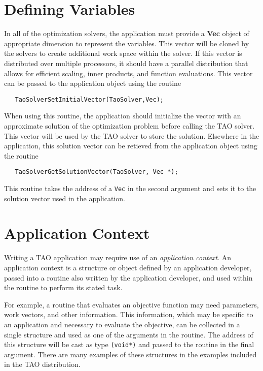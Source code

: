 \section{Defining Variables}
In all of the optimization solvers, the application must provide
a {\bf Vec} object of appropriate dimension to represent the variables.
This vector will be cloned by the solvers to create additional work
space within the solver.
If this vector is distributed over multiple processors, it
should have a parallel distribution that allows
for efficient scaling, inner products, and
function evaluations.  This vector can be passed to the
application object using the routine 
\begin{verbatim}
   TaoSolverSetInitialVector(TaoSolver,Vec);
\end{verbatim}
When using this routine, the application should initialize the vector with
an approximate solution of the optimization problem before calling the
TAO solver.
This vector will be used by the TAO solver to store the solution.
Elsewhere in the application, 
this solution vector can be retieved from the application object 
using the routine 
\begin{verbatim}
   TaoSolverGetSolutionVector(TaoSolver, Vec *);
\end{verbatim}
This routine takes the address of a {\tt Vec} in the second argument and sets it to
the solution vector used in the application.

\section{Application Context}  
Writing a TAO application may require
use of an {\em application context}.
An application context is a structure or object defined by an
application developer, passed
into a routine also written by the application developer, 
and used within the routine to perform its stated task.
 
For example, a routine that evaluates an objective function may need
parameters, work vectors, and other information.   This information,
which may be specific to an application and necessary to evaluate the objective,
can be collected in a single structure and used as one of the
arguments in the routine.
The address of this structure will be cast as type {\tt (void*)} and passed to
the routine in the final argument.
There are many examples of these structures in the examples included in the
TAO distribution.

